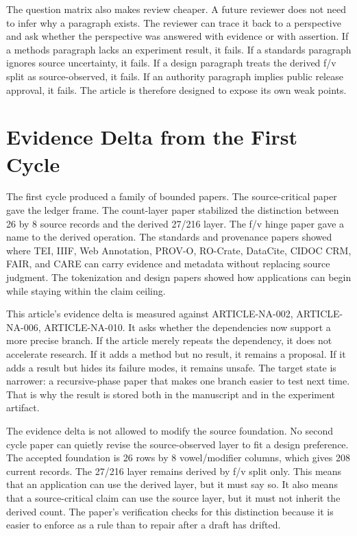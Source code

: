\documentclass[sigconf,nonacm]{acmart}
\begin{document}
The question matrix also makes review cheaper. A future reviewer does not need
to infer why a paragraph exists. The reviewer can trace it back to a perspective
and ask whether the perspective was answered with evidence or with assertion.
If a methods paragraph lacks an experiment result, it fails. If a standards
paragraph ignores source uncertainty, it fails. If a design paragraph treats the
derived f/v split as source-observed, it fails. If an authority paragraph implies
public release approval, it fails. The article is therefore designed to expose
its own weak points.

\section{Evidence Delta from the First Cycle}
The first cycle produced a family of bounded papers. The source-critical paper
gave the ledger frame. The count-layer paper stabilized the distinction between
26 by 8 source records and the derived 27/216 layer. The f/v hinge paper gave a
name to the derived operation. The standards and provenance papers showed where
TEI, IIIF, Web Annotation, PROV-O, RO-Crate, DataCite, CIDOC CRM, FAIR, and CARE
can carry evidence and metadata without replacing source judgment. The
tokenization and design papers showed how applications can begin while staying
within the claim ceiling.

This article's evidence delta is measured against ARTICLE-NA-002, ARTICLE-NA-006, ARTICLE-NA-010. It asks whether the
dependencies now support a more precise branch. If the article merely repeats
the dependency, it does not accelerate research. If it adds a method but no
result, it remains a proposal. If it adds a result but hides its failure modes,
it remains unsafe. The target state is narrower: a recursive-phase paper that makes
one branch easier to test next time. That is why the result is stored both in
the manuscript and in the experiment artifact.

The evidence delta is not allowed to modify the source foundation. No second
cycle paper can quietly revise the source-observed layer to fit a design
preference. The accepted foundation is 26 rows by 8 vowel/modifier columns,
which gives 208 current records. The 27/216 layer remains derived by f/v split
only. This means that an application can use the derived layer, but it must say
so. It also means that a source-critical claim can use the source layer, but it
must not inherit the derived count. The paper's verification checks for this
distinction because it is easier to enforce as a rule than to repair after a
draft has drifted.
\end{document}
